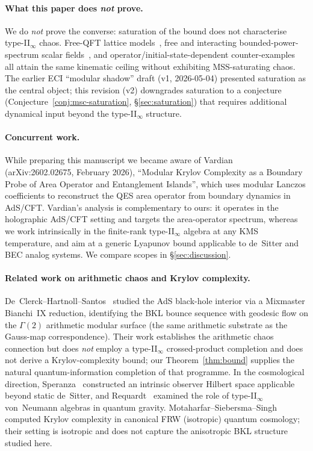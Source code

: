 \documentclass[12pt,a4paper]{article}
\begin{document}
\paragraph{What this paper does \emph{not} prove.}
We do \emph{not} prove the converse: saturation of the bound does
not characterise type-II$_\infty$ chaos.
Free-QFT lattice models~\cite{AvdoshkinDymarsky2019},
free and interacting bounded-power-spectrum scalar
fields~\cite{Camargo2023}, and operator/initial-state-dependent
counter-examples~\cite{Sreeram2025} all attain the same kinematic
ceiling without exhibiting MSS-saturating chaos.
The earlier ECI ``modular shadow'' draft (v1, 2026-05-04) presented
saturation as the central object; this revision (v2) downgrades
saturation to a conjecture (Conjecture~\ref{conj:msc-saturation},
\S\ref{sec:saturation}) that requires additional dynamical input
beyond the type-II$_\infty$ structure.

\paragraph{Concurrent work.}
While preparing this manuscript we became aware of
Vardian~\cite{Vardian2026} (arXiv:2602.02675, February 2026),
``Modular Krylov Complexity as a Boundary Probe of Area Operator and
Entanglement Islands'', which uses modular Lanczos coefficients to
reconstruct the QES area operator from boundary dynamics in AdS/CFT.
Vardian's analysis is complementary to ours: it operates in the
holographic AdS/CFT setting and targets the area-operator spectrum,
whereas we work intrinsically in the finite-rank type-II$_\infty$
algebra at any KMS temperature, and aim at a generic Lyapunov bound
applicable to de~Sitter and BEC analog systems.
We compare scopes in \S\ref{sec:discussion}.

\paragraph{Related work on arithmetic chaos and Krylov complexity.}
De~Clerck--Hartnoll--Santos~\cite{HartnollDCS2024}
studied the AdS black-hole interior via a Mixmaster Bianchi~IX
reduction, identifying the BKL bounce sequence with geodesic flow
on the $\Gamma(2)$ arithmetic modular surface (the same arithmetic
substrate as the Gauss-map correspondence).
Their work establishes the arithmetic chaos connection but does
\emph{not} employ a type-II$_\infty$ crossed-product completion
and does not derive a Krylov-complexity bound; our Theorem~\ref{thm:bound}
supplies the natural quantum-information completion of that programme.
In the cosmological direction, Speranza~\cite{Speranza2025} constructed
an intrinsic observer Hilbert space applicable beyond static de~Sitter,
and Requardt~\cite{Requardt2501} examined the role of type-II$_\infty$
von~Neumann algebras in quantum gravity.
Motaharfar--Siebersma--Singh~\cite{MSS2511} computed Krylov complexity
in canonical FRW (isotropic) quantum cosmology; their setting is
isotropic and does not capture the anisotropic BKL structure
studied here.
\end{document}
